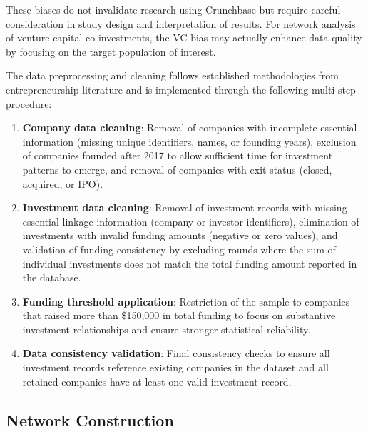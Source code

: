 These biases do not invalidate research using Crunchbase but require careful consideration in study design and interpretation of results. For network analysis of venture capital co-investments, the VC bias may actually enhance data quality by focusing on the target population of interest.

The data preprocessing and cleaning follows established methodologies from entrepreneurship literature \cite{Dalle2025} and is implemented through the following multi-step procedure:

\begin{enumerate}
    \item \textbf{Company data cleaning}: Removal of companies with incomplete essential information (missing unique identifiers, names, or founding years), exclusion of companies founded after 2017 to allow sufficient time for investment patterns to emerge, and removal of companies with exit status (closed, acquired, or IPO).
    
    \item \textbf{Investment data cleaning}: Removal of investment records with missing essential linkage information (company or investor identifiers), elimination of investments with invalid funding amounts (negative or zero values), and validation of funding consistency by excluding rounds where the sum of individual investments does not match the total funding amount reported in the database.
    
    \item \textbf{Funding threshold application}: Restriction of the sample to companies that raised more than \$150{,}000 in total funding to focus on substantive investment relationships and ensure stronger statistical reliability.
    
    
    \item \textbf{Data consistency validation}: Final consistency checks to ensure all investment records reference existing companies in the dataset and all retained companies have at least one valid investment record.
\end{enumerate}

\subsection{Network Construction}

